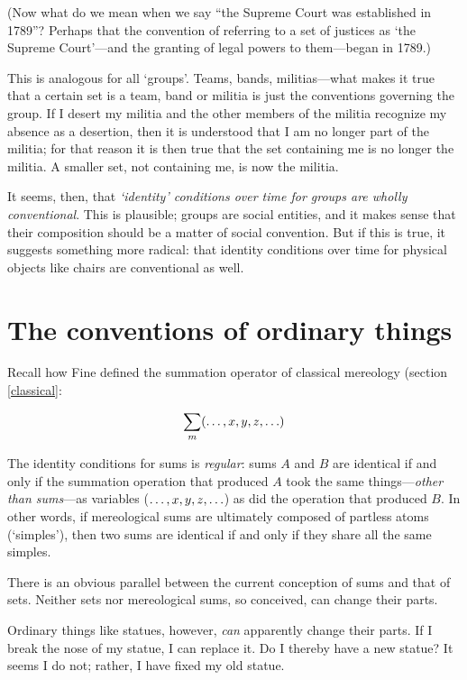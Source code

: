 \documentclass[11pt]{article}
\begin{document}
\begin{spacing}{1.5}
(Now what do we mean when we say ``the Supreme Court was established
in 1789''?  Perhaps that the convention of referring to a set of
justices as `the Supreme Court'---and the granting of legal powers to
them---began in 1789.)

This is analogous for all `groups'.  Teams, bands, militias---what
makes it true that a certain set is a team, band or militia is just
the conventions governing the group.  If I desert my militia and the
other members of the militia recognize my absence as a desertion, then
it is understood that I am no longer part of the militia; for that
reason it is then true that the set containing me is no longer the
militia.  A smaller set, not containing me, is now the militia.

It seems, then, that {\em `identity' conditions over time for groups
  are wholly conventional}.  This is plausible; groups are social
entities, and it makes sense that their composition should be a matter
of social convention.  But if this is true, it suggests something more
radical: that identity conditions over time for physical objects like
chairs are conventional as well.

\section{The conventions of ordinary things}
Recall how Fine defined the summation operator of classical
mereology (section \ref{classical}:

\begin{displaymath}
\sum _m (\mathellipsis , x, y, z, \mathellipsis )
\end{displaymath}

The identity conditions for sums is {\em regular}: sums $A$ and $B$
are identical if and only if the summation operation that produced $A$
took the same things---{\em other than sums}---as variables
($\mathellipsis , x, y, z, \mathellipsis $) as did the operation that
produced $B$.  In other words, if mereological sums are ultimately
composed of partless atoms (`simples'), then two sums are identical if
and only if they share all the same simples.

There is an obvious parallel between the current conception of sums
and that of sets.  Neither sets nor mereological sums, so conceived,
can change their parts.

Ordinary things like statues, however, {\em can} apparently change
their parts.  If I break the nose of my statue, I can replace it.  Do
I thereby have a new statue?  It seems I do not; rather, I have fixed
my old statue.


\end{spacing}
\end{document}
